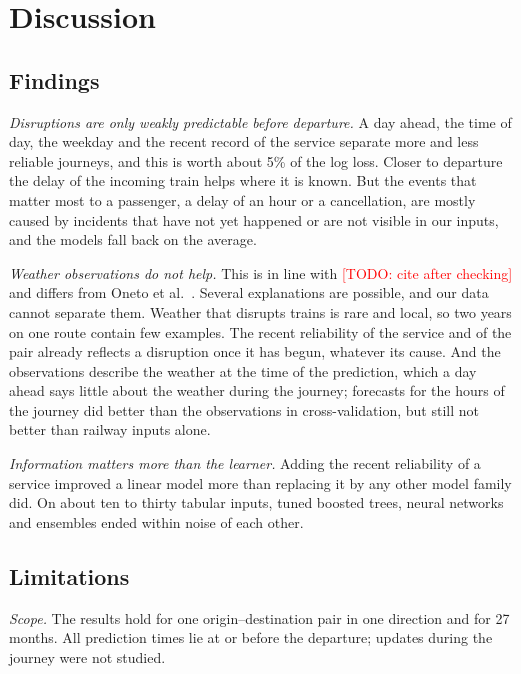 \documentclass[conference]{IEEEtran}
\newcommand{\todo}[1]{\textcolor{red}{[TODO: #1]}}
\begin{document}
\section{Discussion}
\label{sec:discussion}

\subsection{Findings}

\emph{Disruptions are only weakly predictable before departure.} A day ahead, the time of day, the
weekday and the recent record of the service separate more and less reliable journeys, and this is
worth about 5\% of the log loss. Closer to departure the delay of the incoming train helps where it
is known. But the events that matter most to a passenger, a delay of an hour or a cancellation, are
mostly caused by incidents that have not yet happened or are not visible in our inputs, and the
models fall back on the average.

\emph{Weather observations do not help.} This is in line with \todo{cite after checking} and
differs from Oneto et al.~\cite{oneto2016weather}. Several explanations are possible, and our data
cannot separate them. Weather that disrupts trains is rare and local, so two years on one route
contain few examples. The recent reliability of the service and of the pair already
reflects a disruption once it has begun, whatever its cause. And the observations describe the
weather at the time of the prediction, which a day ahead says little about the weather during the
journey; forecasts for the hours of the journey did better than the observations in
cross-validation, but still not better than railway inputs alone.

\emph{Information matters more than the learner.} Adding the recent reliability of a service
improved a linear model more than replacing it by any other model family did. On about ten to thirty
tabular inputs, tuned boosted trees, neural networks and ensembles ended within noise of each other.

\subsection{Limitations}
\label{sec:limits}

\emph{Scope.} The results hold for one origin--destination pair in one direction and for 27 months.
All prediction times lie at or before the departure; updates during the journey were not studied.
\end{document}
